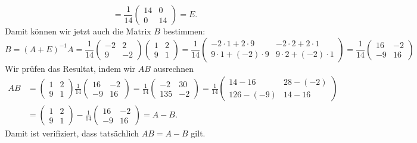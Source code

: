 \begin{loesung}
\[=
\frac1{14}
\begin{pmatrix}
14& 0\\
 0&14
\end{pmatrix}
=E.
\]
Damit können wir jetzt auch die Matrix $B$ bestimmen:
\[
B=(A+E)^{-1}A
=
\frac1{14}
\begin{pmatrix}
-2& 2\\
 9&-2
\end{pmatrix}
\begin{pmatrix}
1&2\\
9&1
\end{pmatrix}
=
\frac1{14}
\begin{pmatrix}
-2 \cdot 1 +   2  \cdot 9 & -2 \cdot 2 +   2  \cdot 1 \\
 9 \cdot 1 + (-2) \cdot 9 &  9 \cdot 2 + (-2) \cdot 1
\end{pmatrix}
=
\frac1{14}
\begin{pmatrix}
16& -2\\
-9&16
\end{pmatrix}
\]
Wir prüfen das Resultat, indem wir $AB$ ausrechnen
\begin{align*}
AB&=
\begin{pmatrix}
1&2\\
9&1
\end{pmatrix}
\frac1{14}
\begin{pmatrix}
16& -2\\
-9& 16
\end{pmatrix}
=
\frac1{14}
\begin{pmatrix}
 -2&30\\
135&-2
\end{pmatrix}
=
\frac1{14}
\begin{pmatrix}
 14 -  16 &28 -(-2)\\
126 - (-9)&14 - 16
\end{pmatrix}
\\
&=
\begin{pmatrix}
 1 & 2\\
 9 & 1
\end{pmatrix}
-
\frac1{14}
\begin{pmatrix}
16& -2\\
-9& 16
\end{pmatrix}
=
A-B.
\end{align*}
Damit ist verifiziert, dass tatsächlich $AB=A-B$ gilt.
\end{loesung}

